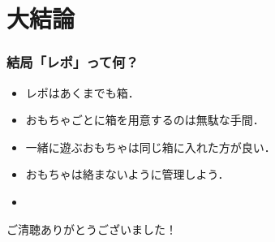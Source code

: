 \section{大結論}

\begin{frame}
    \frametitle{結局「レポ」って何？}
    \begin{itemize}
        \item<2-> レポはあくまでも箱．
        \item<3-> おもちゃごとに箱を用意するのは無駄な手間．
        \item<4-> 一緒に遊ぶおもちゃは同じ箱に入れた方が良い．
        \item<5-> おもちゃは絡まないように管理しよう．
        \item<6-> 
    \end{itemize}
\end{frame}

\begin{frame}
    \LARGE
    ご清聴ありがとうございました！
\end{frame}
